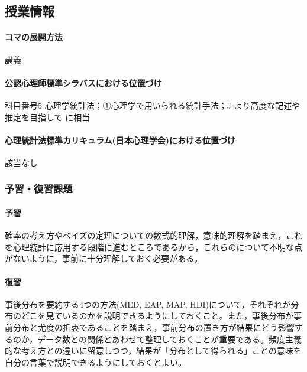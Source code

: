 \subsection{授業情報}
\paragraph{コマの展開方法}
講義
\paragraph{公認心理師標準シラバスにおける位置づけ}
科目番号5 心理学統計法；①心理学で用いられる統計手法；J より高度な記述や推定を目指して に相当
\paragraph{心理統計法標準カリキュラム(日本心理学会)における位置づけ}
該当なし
\subsubsection{予習・復習課題}
\paragraph{予習}確率の考え方やベイズの定理についての数式的理解，意味的理解を踏まえ，これを心理統計に応用する段階に進むところであるから，これらのについて不明な点がないように，事前に十分理解しておく必要がある。
\paragraph{復習}事後分布を要約する4つの方法(MED, EAP, MAP, HDI)について，それぞれが分布のどこを見ているのかを説明できるようにしておくこと。また，事後分布が事前分布と尤度の折衷であることを踏まえ，事前分布の置き方が結果にどう影響するのか，データ数との関係とあわせて整理しておくことが重要である。頻度主義的な考え方との違いに留意しつつ，結果が「分布として得られる」ことの意味を自分の言葉で説明できるようにしておくとよい。
